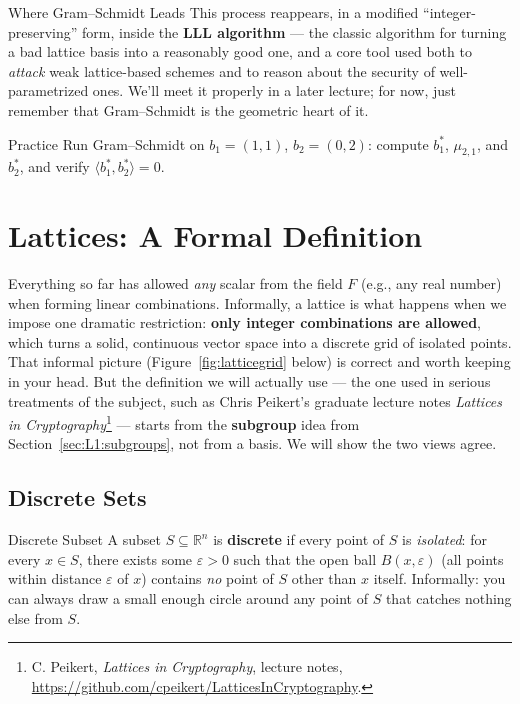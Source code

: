 \begin{previewbox}{Where Gram--Schmidt Leads}
This process reappears, in a modified ``integer-preserving'' form, inside the \textbf{LLL algorithm} --- the classic algorithm for turning a bad lattice basis into a reasonably good one, and a core tool used both to \emph{attack} weak lattice-based schemes and to reason about the security of well-parametrized ones. We'll meet it properly in a later lecture; for now, just remember that Gram--Schmidt is the geometric heart of it.
\end{previewbox}

\begin{exercisebox}{Practice}
Run Gram--Schmidt on $b_1 = (1,1)$, $b_2 = (0,2)$: compute $b_1^*$, $\mu_{2,1}$, and $b_2^*$, and verify $\langle b_1^*, b_2^* \rangle = 0$.
\end{exercisebox}

\section{Lattices: A Formal Definition}
\label{sec:L1:lattices-a-formal-definition}

Everything so far has allowed \emph{any} scalar from the field $F$ (e.g., any real number) when forming linear combinations. Informally, a lattice is what happens when we impose one dramatic restriction: \textbf{only integer combinations are allowed}, which turns a solid, continuous vector space into a discrete grid of isolated points. That informal picture (Figure~\ref{fig:latticegrid} below) is correct and worth keeping in your head. But the definition we will actually use --- the one used in serious treatments of the subject, such as Chris Peikert's graduate lecture notes \emph{Lattices in Cryptography}\footnote{C. Peikert, \emph{Lattices in Cryptography}, lecture notes, \url{https://github.com/cpeikert/LatticesInCryptography}.} --- starts from the \textbf{subgroup} idea from Section~\ref{sec:L1:subgroups}, not from a basis. We will show the two views agree.

\subsection{Discrete Sets}
\label{sec:L1:discrete-sets}

\begin{defbox}{Discrete Subset}
A subset $S \subseteq \mathbb{R}^n$ is \textbf{discrete} if every point of $S$ is \emph{isolated}: for every $x \in S$, there exists some $\varepsilon > 0$ such that the open ball $B(x,\varepsilon)$ (all points within distance $\varepsilon$ of $x$) contains \emph{no} point of $S$ other than $x$ itself. Informally: you can always draw a small enough circle around any point of $S$ that catches nothing else from $S$.
\end{defbox}

